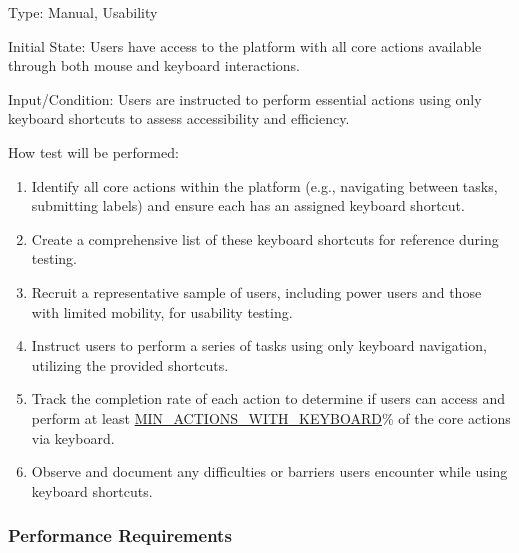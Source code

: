 \documentclass[12pt, titlepage]{article}
\begin{document}
\begin{enumerate}
Type: Manual, Usability

Initial State: Users have access to the platform with all core actions available through both mouse and keyboard interactions.

Input/Condition: Users are instructed to perform essential actions using only keyboard shortcuts to assess accessibility and efficiency.

How test will be performed:
\begin{enumerate}
    \item Identify all core actions within the platform (e.g., navigating between tasks, submitting labels) and ensure each has an assigned keyboard shortcut.
    \item Create a comprehensive list of these keyboard shortcuts for reference during testing.
    \item Recruit a representative sample of users, including power users and those with limited mobility, for usability testing.
    \item Instruct users to perform a series of tasks using only keyboard navigation, utilizing the provided shortcuts.
    \item Track the completion rate of each action to determine if users can access and perform at least \hyperref[MIN_ACTIONS_WITH_KEYBOARD]{MIN\_ACTIONS\_WITH\_KEYBOARD}\% of the core actions via keyboard.
    \item Observe and document any difficulties or barriers users encounter while using keyboard shortcuts.
\end{enumerate}
\end{enumerate}





\subsubsection{Performance Requirements}
\end{document}
